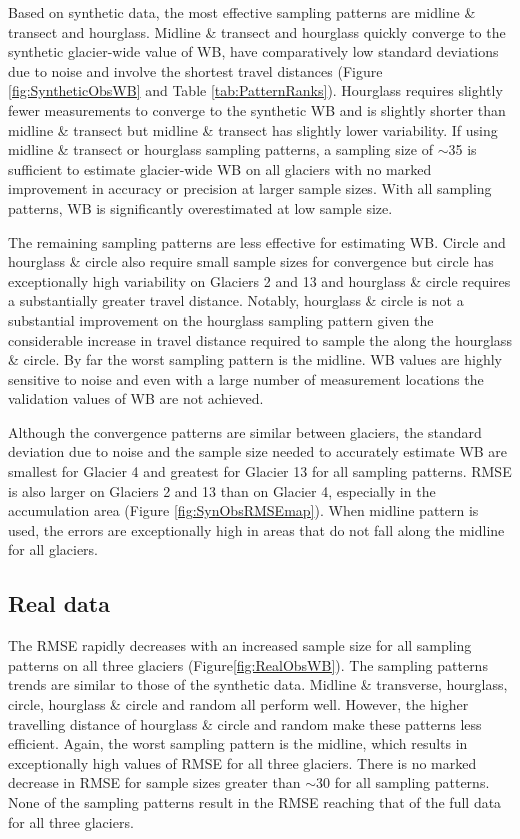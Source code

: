 \documentclass{article}
\begin{document}
Based on synthetic data, the most effective sampling patterns are midline \& transect and hourglass. Midline \& transect and hourglass quickly converge to the synthetic glacier-wide value of WB, have comparatively low standard deviations due to noise and involve the shortest travel distances (Figure \ref{fig:SyntheticObsWB} and Table \ref{tab:PatternRanks}). Hourglass requires slightly fewer measurements to converge to the synthetic WB and is slightly shorter than midline \& transect but midline \& transect has slightly lower variability. If using midline \& transect or hourglass sampling patterns, a sampling size of $\sim$35 is sufficient to estimate glacier-wide WB on all glaciers with no marked improvement in accuracy or precision at larger sample sizes. With all sampling patterns, WB is significantly overestimated at low sample size.

The remaining sampling patterns are less effective for estimating WB. Circle and hourglass \& circle also require small sample sizes for convergence but circle has exceptionally high variability on Glaciers 2 and 13 and hourglass \& circle requires a substantially greater travel distance. Notably, hourglass \& circle is not a substantial improvement on the hourglass sampling pattern given the considerable increase in travel distance required to sample the along the hourglass \& circle. By far the worst sampling pattern is the midline. WB values are highly sensitive to noise and even with a large number of measurement locations the validation values of WB are not achieved.

Although the convergence patterns are similar between glaciers, the standard deviation due to noise and the sample size needed to accurately estimate WB are smallest for Glacier 4 and greatest for Glacier 13 for all sampling patterns. RMSE is also larger on Glaciers 2 and 13 than on Glacier 4, especially in the accumulation area (Figure \ref{fig:SynObsRMSEmap}). When midline pattern is used, the errors are exceptionally high in areas that do not fall along the midline for all glaciers.


\subsection{Real data}

The RMSE rapidly decreases with an increased sample size for all sampling patterns on all three glaciers (Figure\ref{fig:RealObsWB}). The sampling patterns trends are similar to those of the synthetic data. Midline \& transverse, hourglass, circle, hourglass \& circle and random all perform well. However, the higher travelling distance of hourglass \& circle and random make these patterns less efficient.  Again, the worst sampling pattern is the midline, which results in exceptionally high values of RMSE for all three glaciers. There is no marked decrease in RMSE for sample sizes greater than $\sim30$ for all sampling patterns. None of the sampling patterns result in the RMSE reaching that of the full data for all three glaciers. 
\end{document}
